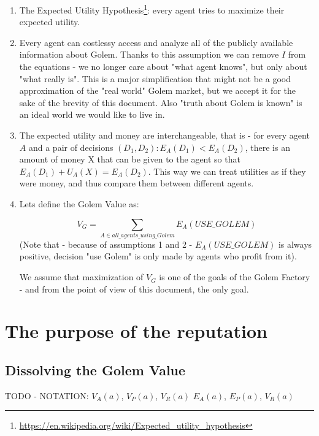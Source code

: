 \documentclass{article}
\begin{document}
\begin{enumerate}
\item The Expected Utility Hypothesis\footnote{\href{https://en.wikipedia.org/wiki/Expected\_utility\_hypothesis}{https://en.wikipedia.org/wiki/Expected\_utility\_hypothesis}}: every agent tries to maximize their expected utility.

\item Every agent can costlessy access and analyze all of the publicly available information about Golem. Thanks to this assumption we can remove $I$ from the equations - we no longer
    care about "what agent knows", but only about "what really is". This is a major simplification that might not be a good approximation of the "real world" Golem market, but we
    accept it for the sake of the brevity of this document. Also "truth about Golem is known" is an ideal world we would like to live in.

\item The expected utility and money are interchangeable, that is - for every agent $A$ and a pair of decisions $(D_1, D_2): E_A(D_1) < E_A(D_2)$, there is an amount of money X that
    can be given to the agent so that $E_A(D_1) + U_A(X) = E_A(D_2)$. This way we can treat utilities as if they were money, and thus compare them between different agents.

\item Lets define the Golem Value as:

\begin{equation}
    V_G = \sum_{A \in all\_agents\_using\_Golem}E_A(USE\_GOLEM)
\end{equation}
(Note that - because of assumptions 1 and 2 - $E_A(USE\_GOLEM)$ is always positive, decision "use Golem" is only made by agents who profit from it).

We assume that maximization of $V_G$ is one of the goals of the Golem Factory - and from the point of view of this document, the only goal.
\end{enumerate}

\section{The purpose of the reputation}
\subsection{Dissolving the Golem Value}

TODO - NOTATION:
$V_A(a)$, $V_P(a)$, $V_R(a)$
$E_A(a)$, $E_P(a)$, $V_R(a)$
\end{document}
